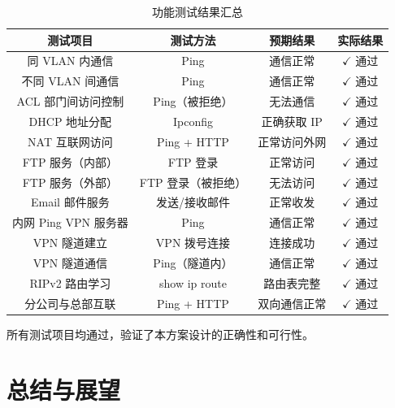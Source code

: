 \documentclass[12pt,a4paper]{ctexart}
\begin{document}
\begin{table}[H]
\centering
\caption{功能测试结果汇总}
\label{tab:test-summary}
\begin{tabular}{|c|c|c|c|}
\hline
\textbf{测试项目}           & \textbf{测试方法}    & \textbf{预期结果}   & \textbf{实际结果}   \\ \hline
同 VLAN 内通信              & Ping                 & 通信正常            & $\checkmark$ 通过    \\ \hline
不同 VLAN 间通信            & Ping                 & 通信正常            & $\checkmark$ 通过    \\ \hline
ACL 部门间访问控制          & Ping（被拒绝）       & 无法通信            & $\checkmark$ 通过    \\ \hline
DHCP 地址分配               & Ipconfig             & 正确获取 IP         & $\checkmark$ 通过    \\ \hline
NAT 互联网访问              & Ping + HTTP          & 正常访问外网        & $\checkmark$ 通过    \\ \hline
FTP 服务（内部）            & FTP 登录             & 正常访问            & $\checkmark$ 通过    \\ \hline
FTP 服务（外部）            & FTP 登录（被拒绝）   & 无法访问            & $\checkmark$ 通过    \\ \hline
Email 邮件服务              & 发送/接收邮件        & 正常收发            & $\checkmark$ 通过    \\ \hline
内网 Ping VPN 服务器        & Ping                 & 通信正常            & $\checkmark$ 通过    \\ \hline
VPN 隧道建立                & VPN 拨号连接         & 连接成功            & $\checkmark$ 通过    \\ \hline
VPN 隧道通信                & Ping（隧道内）       & 通信正常            & $\checkmark$ 通过    \\ \hline
RIPv2 路由学习              & show ip route        & 路由表完整          & $\checkmark$ 通过    \\ \hline
分公司与总部互联            & Ping + HTTP          & 双向通信正常        & $\checkmark$ 通过    \\ \hline
\end{tabular}
\end{table}

所有测试项目均通过，验证了本方案设计的正确性和可行性。

\section{总结与展望}
\end{document}

